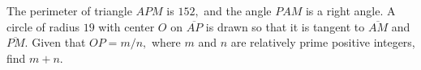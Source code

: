 The perimeter of triangle $APM$ is $152,$ and the angle $PAM$ is a right angle. A circle of radius $19$ with center $O$ on $\overline{AP}$ is drawn so that it is tangent to $\overline{AM}$ and $\overline{PM}.$ Given that $OP=m/n,$ where $m$ and $n$ are relatively prime positive integers, find $m+n.$